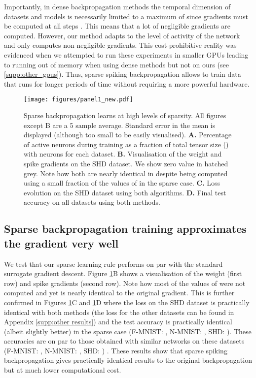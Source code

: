 \documentclass{article}
\begin{document}
Importantly, in dense backpropagation methods the temporal dimension of datasets and models is necessarily limited to a maximum of  since gradients must be computed at all steps \cite{cramer2020heidelberg, perez2021neural}. This means that a lot of negligible gradients are computed. However, our method adapts to the level of activity of the network and only computes non-negligible gradients. This cost-prohibitive reality was evidenced when we attempted to run these experiments in smaller GPUs leading to running out of memory when using dense methods but not on ours (see \ref{supp:other_gpus}). Thus, sparse spiking backpropagation allows to train data that runs for longer periods of time without requiring a more powerful hardware.



\begin{figure}[!tb]
\centering 
\texttt{[image: figures/panel1\_new.pdf]}
\caption{Sparse backpropagation learns at high levels of sparsity. All figures except B are a 5 sample average. Standard error in the mean is displayed (although too small to be easily visualised). \textbf{A.} Percentage of active neurons during training as a fraction of total tensor size () with  neurons for each dataset. \textbf{B.} Visualisation of the weight and spike gradients on the SHD dataset. We show zero value in hatched grey. Note how both  are nearly identical in despite being computed using a small fraction of the values of  in the sparse case. \textbf{C.} Loss evolution on the SHD dataset using both algorithms. \textbf{D.} Final test accuracy on all datasets using both methods.}
\label{fig:panel1}
\vspace{-0.1cm}
\end{figure}


\subsection{Sparse backpropagation training approximates the gradient very well}

We test that our sparse learning rule performs on par with the standard surrogate gradient descent. Figure \ref{fig:panel1}B shows a visualisation of the weight (first row) and spike gradients (second row). Note how most of the values of  were not computed and yet  is nearly identical to the original gradient. This is further confirmed in Figures \ref{fig:panel1}C and \ref{fig:panel1}D where the loss on the SHD dataset is practically identical with both methods (the loss for the other datasets can be found in Appendix \ref{supp:other results}) and the test accuracy is practically identical (albeit slightly better) in the sparse case (F-MNIST: , N-MNIST: , SHD: ). These accuracies are on par to those obtained with similar networks on these datasets (F-MNIST: , N-MNIST: , SHD: ) \cite{cramer2020heidelberg, zenke2021remarkable, perez2021neural}. These results show that sparse spiking backpropagation gives practically identical results to the original backpropagation but at much lower computational cost.
\end{document}
